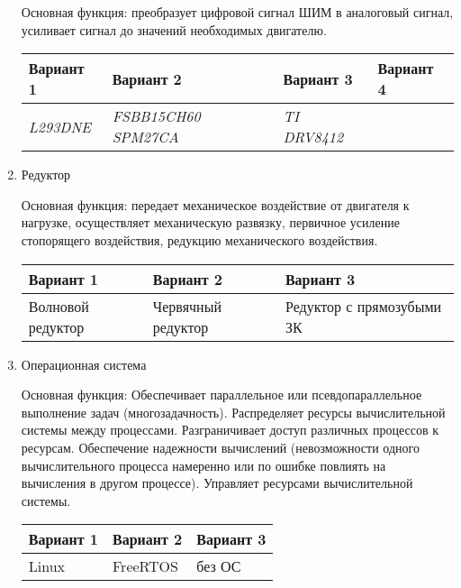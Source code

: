 \begin{enumerate}
        Основная функция: преобразует цифровой сигнал ШИМ в аналоговый сигнал,
        усиливает сигнал до значений необходимых двигателю.

        \begin{tabular}{|p{3.5cm}|p{3.5cm}|p{3.5cm}|p{3.5cm}|}
            \hline
            Вариант 1 & Вариант 2 & Вариант 3 & Вариант 4 \\
            \hline
            \textit{L293DNE} &
            \textit{FSBB15CH60 SPM27CA} &
            \textit{TI DRV8412} \\
            \hline
        \end{tabular}

    \item Редуктор

        Основная функция: передает механическое воздействие от двигателя к
        нагрузке, осуществляет механическую развязку, первичное усиление
        стопорящего воздействия, редукцию механического воздействия.

        \begin{tabular}{|p{3.5cm}|p{3.5cm}|p{3.5cm}|}
            \hline
            Вариант 1 & Вариант 2 & Вариант 3 \\
            \hline
            Волновой редуктор &
            Червячный редуктор &
            Редуктор с прямозубыми ЗК \\
            \hline
        \end{tabular}

    \item Операционная система

        Основная функция: Обеспечивает параллельное или псевдопараллельное
        выполнение задач (многозадачность). Распределяет ресурсы вычислительной
        системы между процессами. Разграничивает доступ различных процессов к
        ресурсам. Обеспечение надежности вычислений (невозможности одного
        вычислительного процесса намеренно или по ошибке повлиять на вычисления
        в другом процессе). Управляет ресурсами вычислительной системы.

        \begin{tabular}{|p{3.5cm}|p{3.5cm}|p{3.5cm}|}
            \hline
            Вариант 1 & Вариант 2 & Вариант 3 \\
            \hline
            Linux &
            FreeRTOS &
            без ОС \\
            \hline
        \end{tabular}
\end{enumerate}

